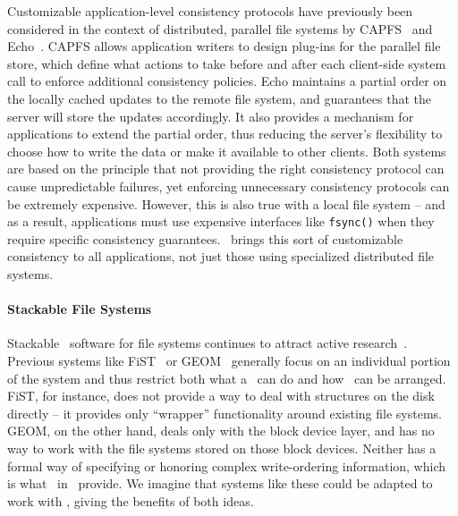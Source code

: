 Customizable application-level consistency protocols have previously been
considered in the context of distributed, parallel file systems by
CAPFS~\cite{vilayannur05providing} and Echo~\cite{mann94coherent}.
%
CAPFS allows application writers to design plug-ins for the parallel file store,
which define what actions to take before and after each client-side system call
to enforce additional consistency policies.
%
Echo maintains a partial order on the locally cached updates to the remote file
system, and guarantees that the server will store the updates accordingly. It
also provides a mechanism for applications to extend the partial order, thus
reducing the server's flexibility to choose how to write the data or make it
available to other clients.
%
Both systems are based on the principle that not providing the right
consistency protocol can cause unpredictable failures, yet enforcing
unnecessary consistency protocols can be extremely expensive.
%
However, this is also true with a local file system -- and as a result,
applications must use expensive interfaces like \texttt{fsync()} when they
require specific consistency guarantees.
%
\Kudos\ brings this sort of customizable consistency to all applications, not
just those using specialized distributed file systems.


\paragraph{Stackable File Systems}


Stackable \module\ software for file systems continues to attract active
research~\cite{rosenthal90evolving, heidemann91layered, skinner93stacking,
heidemann94filesystem,zadok99extending,
zadok00fist,wright03ncryptfs,wright06versatility}. Previous
systems like FiST~\cite{zadok00fist} or GEOM~\cite{geom} generally focus on
an individual portion of the system and thus restrict both what a \module\
can do and how \modules\ can be arranged. FiST, for instance, does not
provide a way to deal with structures on the disk directly -- it provides
only ``wrapper'' functionality around existing file
systems. %
GEOM, on the other hand, deals only with the block device layer, and has no
way to work with the file systems stored on those block devices. Neither
has a formal way of specifying or honoring complex write-ordering
information, which is what \chdescs\ in \Kudos\ provide. We imagine that
systems like these could be adapted to work with \chdescs, giving the
benefits of both ideas.

